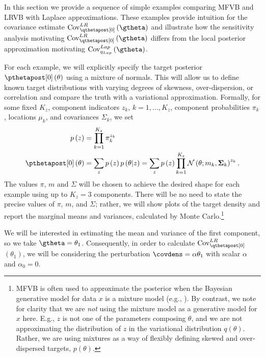 \documentclass{article}\usepackage[]{graphicx}\usepackage[]{color}
\theoremstyle{definition}
\theoremstyle{plain}
\theoremstyle{plain}
\theoremstyle{plain}
\theoremstyle{definition}
\theoremstyle{plain}
\theoremstyle{plain}
\begin{document}
\newcommand{\simpleNumVBSamples}{10000}


In this section we provide a sequence of simple examples comparing MFVB and LRVB
with Laplace approximations. These examples provide intuition for the
covariance estimate $\lrvbcov\left(\gtheta\right)$ and illustrate how the
sensitivity analysis motivating $\lrvbcov\left(\gtheta\right)$ differs from the
local posterior approximation motivating $\covlap\left(\gtheta\right)$.

For each example, we will explicitly specify the target posterior
$\pzeropost\left(\theta\right)$ using a mixture of normals. This
will allow us to define known target distributions with varying degrees
of skewness, over-dispersion, or correlation and compare the truth
with a variational approximation. Formally, for some fixed $K_{z}$,
component indicators $z_{k}$, $k=1,...,K_{z}$, component probabilities
$\pi_{k}$, locations $\mu_{k}$, and covariances $\Sigma_{k}$, we
set
\begin{align*}
p\left(z\right) & =\prod_{k=1}^{K_{z}}\pi_{k}^{z_{k}}\\
\pzeropost\left(\theta\right) & =\sum_{z}p\left(z\right)
    p\left(\theta\vert z\right)=\sum_{z}p\left(z\right)
    \prod_{k=1}^{K_{z}}\mathcal{N}\left(\theta;m_{k},\covmat_{k}\right)^{z_{k}}.
\end{align*}
The values $\pi$, $m$ and $\Sigma$ will be chosen to achieve the desired shape
for each example using up to $K_{z}=3$ components. There will be no need to
state the precise values of $\pi$, $m$, and $\Sigma$; rather, we will
show plots of the target density and report the marginal means and variances,
calculated by Monte Carlo.\footnote{MFVB is often
used to approximate the posterior when the Bayesian generative model for data $x$ is a mixture model
(e.g., \citet{blei:2003:lda}). By contrast, we note for clarity that we
are \emph{not} using the mixture model as a generative model for $x$ here.
E.g., $z$ is not one of the parameters composing $\theta$, and we are not approximating the
distribution of $z$ in the variational distribution $q\left(\theta\right)$.
Rather, we are using mixtures as a way of flexibly defining skewed and
over-dispersed targets, $p\left(\theta\right)$.}

We will be interested in estimating the mean and variance of the first
component, so we take $\gtheta=\theta_{1}$. Consequently, in order
to calculate $\lrvbcov$$\left(\theta_{1}\right)$, we will be considering
the perturbation $\covdens=\alpha\theta_{1}$ with scalar $\alpha$
and $\alpha_{0}=0$.
\end{document}
